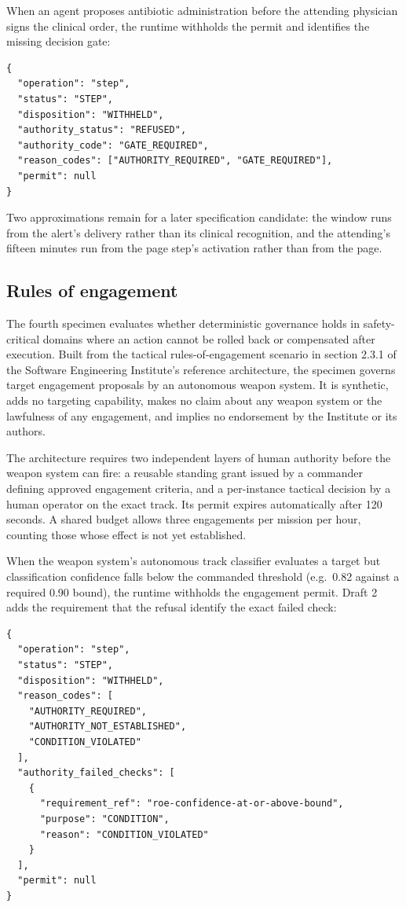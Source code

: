 \documentclass[
  american,
  11pt,
  letterpaper,
]{article}
\begin{document}
When an agent proposes antibiotic administration before the attending
physician signs the clinical order, the runtime withholds the permit and
identifies the missing decision gate:

\begin{lstlisting}
{
  "operation": "step",
  "status": "STEP",
  "disposition": "WITHHELD",
  "authority_status": "REFUSED",
  "authority_code": "GATE_REQUIRED",
  "reason_codes": ["AUTHORITY_REQUIRED", "GATE_REQUIRED"],
  "permit": null
}
\end{lstlisting}

Two approximations remain for a later specification candidate: the
window runs from the alert's delivery rather than its clinical
recognition, and the attending's fifteen minutes run from the page
step's activation rather than from the page.

\subsection{Rules of engagement}\label{rules-of-engagement}

The fourth specimen evaluates whether deterministic governance holds in
safety-critical domains where an action cannot be rolled back or
compensated after execution. Built from the tactical rules-of-engagement
scenario in section 2.3.1 of the Software Engineering Institute's
reference architecture, the specimen governs target engagement proposals
by an autonomous weapon system. It is synthetic, adds no targeting
capability, makes no claim about any weapon system or the lawfulness of
any engagement, and implies no endorsement by the Institute or its
authors.

The architecture requires two independent layers of human authority
before the weapon system can fire: a reusable standing grant issued by a
commander defining approved engagement criteria, and a per-instance
tactical decision by a human operator on the exact track. Its permit
expires automatically after 120 seconds. A shared budget allows three
engagements per mission per hour, counting those whose effect is not yet
established.

When the weapon system's autonomous track classifier evaluates a target
but classification confidence falls below the commanded threshold
(e.g.~0.82 against a required 0.90 bound), the runtime withholds the
engagement permit. Draft 2 adds the requirement that the refusal
identify the exact failed check:

\begin{lstlisting}
{
  "operation": "step",
  "status": "STEP",
  "disposition": "WITHHELD",
  "reason_codes": [
    "AUTHORITY_REQUIRED",
    "AUTHORITY_NOT_ESTABLISHED",
    "CONDITION_VIOLATED"
  ],
  "authority_failed_checks": [
    {
      "requirement_ref": "roe-confidence-at-or-above-bound",
      "purpose": "CONDITION",
      "reason": "CONDITION_VIOLATED"
    }
  ],
  "permit": null
}
\end{lstlisting}
\end{document}
